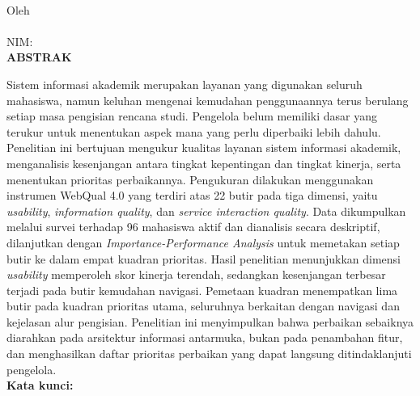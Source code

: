 %
{}
\begin{center}
    \textbf{\judulid}\\[0.5cm]
    Oleh\\
    \penulis\\
    NIM: \nim\\[1.5em]
    \textbf{ABSTRAK}\\[0.5cm]
\end{center}

Sistem informasi akademik merupakan layanan yang digunakan seluruh mahasiswa,
namun keluhan mengenai kemudahan penggunaannya terus berulang setiap masa
pengisian rencana studi. Pengelola belum memiliki dasar yang terukur untuk
menentukan aspek mana yang perlu diperbaiki lebih dahulu. Penelitian ini
bertujuan mengukur kualitas layanan sistem informasi akademik, menganalisis
kesenjangan antara tingkat kepentingan dan tingkat kinerja, serta menentukan
prioritas perbaikannya. Pengukuran dilakukan menggunakan instrumen WebQual 4.0
yang terdiri atas 22 butir pada tiga dimensi, yaitu \textit{usability},
\textit{information quality}, dan \textit{service interaction quality}. Data
dikumpulkan melalui survei terhadap 96 mahasiswa aktif dan dianalisis secara
deskriptif, dilanjutkan dengan \textit{Importance-Performance Analysis} untuk
memetakan setiap butir ke dalam empat kuadran prioritas. Hasil penelitian
menunjukkan dimensi \textit{usability} memperoleh skor kinerja terendah,
sedangkan kesenjangan terbesar terjadi pada butir kemudahan navigasi. Pemetaan
kuadran menempatkan lima butir pada kuadran prioritas utama, seluruhnya
berkaitan dengan navigasi dan kejelasan alur pengisian. Penelitian ini
menyimpulkan bahwa perbaikan sebaiknya diarahkan pada arsitektur informasi
antarmuka, bukan pada penambahan fitur, dan menghasilkan daftar prioritas
perbaikan yang dapat langsung ditindaklanjuti pengelola.\\[0.6cm]

\noindent \textbf{Kata kunci:} \katakunci
\clearpage
